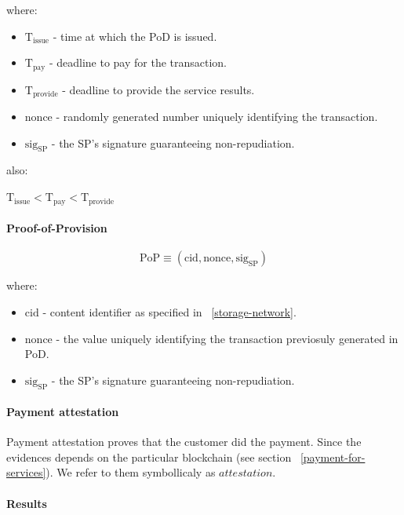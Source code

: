 \documentclass{ieeeaccess}
\begin{document}
where:

\begin{itemize}

\item $\mathrm{T}_\mathrm{issue}$ - time at which the PoD is issued.
\item
  $\mathrm{T}_\mathrm{pay}$ - deadline to pay for the transaction.
\item
  $\mathrm{T}_\mathrm{provide}$ - deadline to provide the service
  results.
\item $\mathrm{nonce}$ - randomly generated number uniquely identifying
  the transaction.
\item $\mathrm{sig}_\mathrm{SP}$ - the SP's signature guaranteeing
  non-repudiation.
\end{itemize}

also:

\(\mathrm{T}_\mathrm{issue} < \mathrm{T}_\mathrm{pay} < \mathrm{T}_\mathrm{provide}\)

\paragraph{Proof-of-Provision}\label{proof-of-provision}

\[\mathrm{PoP} \equiv (\mathrm{cid}, \mathrm{nonce}, \mathrm{sig}_\mathrm{SP})\]

where:

\begin{itemize}

\item
  \(\mathrm{cid}\) - content identifier as specified in ~\ref{storage-network}.
\item
  \(\mathrm{nonce}\) - the value uniquely identifying the transaction
  previosuly generated in PoD.
\item
  \(\mathrm{sig}_\mathrm{SP}\) - the SP's signature guaranteeing
  non-repudiation.
\end{itemize}

\paragraph{Payment attestation}\label{payment-attestation}

Payment attestation proves that the customer did the payment. Since the
evidences depends on the particular blockchain (see section ~\ref{payment-for-services}). We refer to them symbollicaly as
\(attestation\).

\paragraph{Results}\label{results}
\end{document}
